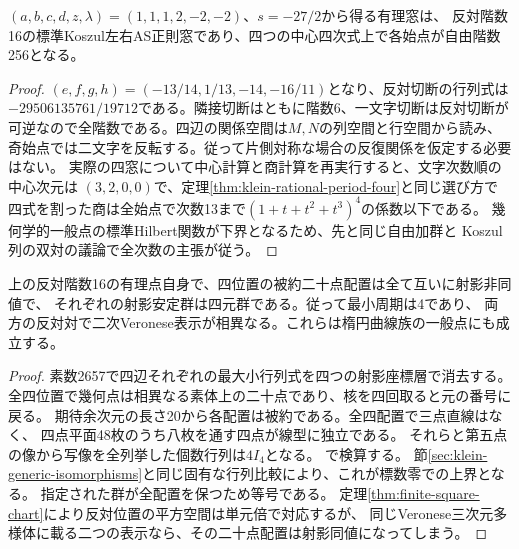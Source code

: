 \begin{proposition}\label{prop:klein-rational-full-opposite}
$(a,b,c,d,z,\lambda)=(1,1,1,2,-2,-2)$、$s=-27/2$から得る有理窓は、
反対階数16の標準Koszul左右AS正則窓であり、四つの中心四次式上で各始点が自由階数256となる。
\end{proposition}
\begin{proof}
$(e,f,g,h)=(-13/14,1/13,-14,-16/11)$となり、反対切断の行列式は
$-29506135761/19712$である。隣接切断はともに階数6、一文字切断は反対切断が
可逆なので全階数である。四辺の関係空間は$M,N$の列空間と行空間から読み、
奇始点では二文字を反転する。従って片側対称な場合の反復関係を仮定する必要はない。
実際の四窓について中心計算と商計算を再実行すると、文字次数順の中心次元は
$(3,2,0,0)$で、定理\ref{thm:klein-rational-period-four}と同じ選び方で
四式を割った商は全始点で次数13まで$(1+t+t^2+t^3)^4$の係数以下である。
幾何学的一般点の標準Hilbert関数が下界となるため、先と同じ自由加群と
Koszul列の双対の議論で全次数の主張が従う。
\end{proof}

\begin{corollary}\label{cor:klein-four-configurations}
上の反対階数16の有理点自身で、四位置の被約二十点配置は全て互いに射影非同値で、
それぞれの射影安定群は四元群である。従って最小周期は4であり、
両方の反対対で二次Veronese表示が相異なる。これらは楕円曲線族の一般点にも成立する。
\end{corollary}
\begin{proof}
素数2657で四辺それぞれの最大小行列式を四つの射影座標層で消去する。
全四位置で幾何点は相異なる素体上の二十点であり、核を四回取ると元の番号に戻る。
期待余次元の長さ20から各配置は被約である。全四配置で三点直線はなく、
四点平面48枚のうち八枚を通す四点が線型に独立である。
それらと第五点の像から写像を全列挙した個数行列は$4 I_4$となる。
で検算する。
節\ref{sec:klein-generic-isomorphisms}と同じ固有な行列比較により、これが標数零での上界となる。
指定された群が全配置を保つため等号である。
定理\ref{thm:finite-square-chart}により反対位置の平方空間は単元倍で対応するが、
同じVeronese三次元多様体に載る二つの表示なら、その二十点配置は射影同値になってしまう。
\end{proof}

